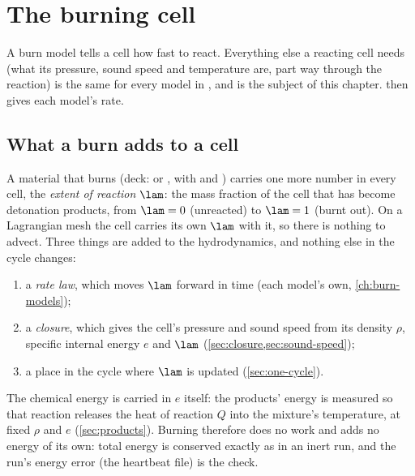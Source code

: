 \chapter{The burning cell}
\label{ch:burning-cell}


A burn model tells a cell how fast to react. Everything else a reacting
cell needs (what its pressure, sound speed and temperature are, part way
through the reaction) is the same for every model in \bw, and is the
subject of this chapter.  then gives each model's rate.

\section{What a burn adds to a cell}
\label{sec:burn-adds}

A material that burns (deck:  or ,
with  and ) carries one
more number in every cell, the \emph{extent of reaction} $\lam$: the mass
fraction of the cell that has become detonation products, from $\lam = 0$
(unreacted) to $\lam = 1$ (burnt out). On a Lagrangian mesh the cell
carries its own $\lam$ with it, so there is nothing to advect. Three things
are added to the hydrodynamics, and nothing else in the cycle changes:
\begin{enumerate}
\item a \emph{rate law}, which moves $\lam$ forward in time (each model's
  own, \cref{ch:burn-models});
\item a \emph{closure}, which gives the cell's pressure and sound speed from
  its density $\rho$, specific internal energy $e$ and $\lam$
  (\cref{sec:closure,sec:sound-speed});
\item a place in the cycle where $\lam$ is updated (\cref{sec:one-cycle}).
\end{enumerate}

The chemical energy is carried in $e$ itself: the products' energy is
measured so that reaction releases the heat of reaction $Q$ into the
mixture's temperature, at fixed $\rho$ and $e$ (\cref{sec:products}).
Burning therefore does no work and adds no energy of its own: total energy
is conserved exactly as in an inert run, and the run's energy error (the
heartbeat file) is the check.

